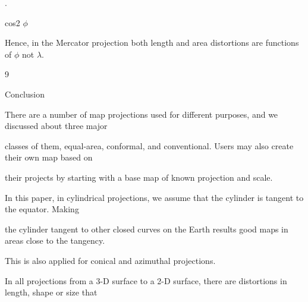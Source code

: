 \documentclass[a4paper,portrait,12pt]{article}
\begin{document}
.


\begin{flushleft}
cos2 $\phi$
\end{flushleft}


\begin{flushleft}
Hence, in the Mercator projection both length and area distortions are functions of $\phi$ not $\lambda$.
\end{flushleft}





9





\begin{flushleft}
Conclusion
\end{flushleft}





\begin{flushleft}
There are a number of map projections used for different purposes, and we discussed about three major
\end{flushleft}


\begin{flushleft}
classes of them, equal-area, conformal, and conventional. Users may also create their own map based on
\end{flushleft}


\begin{flushleft}
their projects by starting with a base map of known projection and scale.
\end{flushleft}


\begin{flushleft}
In this paper, in cylindrical projections, we assume that the cylinder is tangent to the equator. Making
\end{flushleft}


\begin{flushleft}
the cylinder tangent to other closed curves on the Earth results good maps in areas close to the tangency.
\end{flushleft}


\begin{flushleft}
This is also applied for conical and azimuthal projections.
\end{flushleft}


\begin{flushleft}
In all projections from a 3-D surface to a 2-D surface, there are distortions in length, shape or size that
\end{flushleft}
\end{document}
